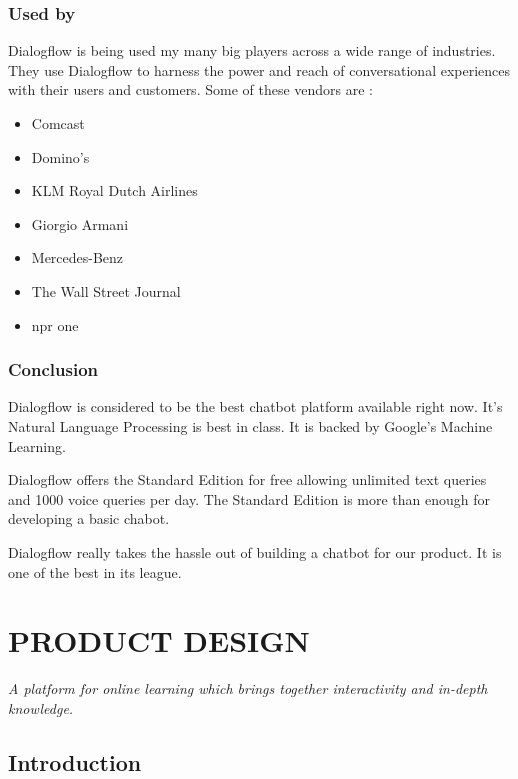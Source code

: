 \subsection{Used by}
Dialogflow is being used my many big players across a wide range of industries. They use Dialogflow to harness the power and reach of conversational experiences with their users and customers. Some of these vendors are :
\begin{itemize}

\item{Comcast}

\item{Domino's}

\item{KLM Royal Dutch Airlines}

\item{Giorgio Armani}

\item{Mercedes-Benz}

\item{The Wall Street Journal}

\item{npr one}
\end{itemize}

\subsection{Conclusion}
Dialogflow is considered to be the best chatbot platform available right now. It's Natural Language Processing is best in class. It is backed by Google's Machine Learning.

Dialogflow offers the Standard Edition for free allowing unlimited text queries and 1000 voice queries per day. The Standard Edition is more than enough for developing a basic chabot.

Dialogflow really takes the hassle out of building a chatbot for our product. It is one of the best in its league.

\chapter{PRODUCT DESIGN}  %

{\em A platform for online learning which brings together interactivity and in-depth knowledge.}


\section{Introduction}


